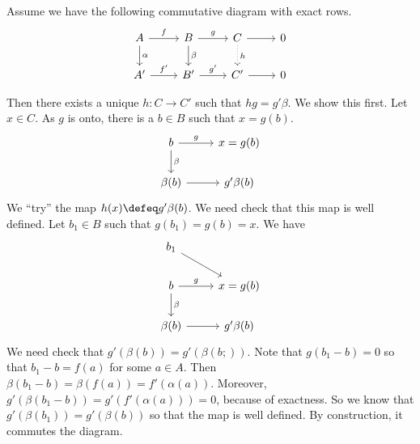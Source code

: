 \pf Assume we have the following commutative diagram with exact rows.
	\[
	\begin{tikzcd}
	A \arrow{r}{f} \arrow{d}{\alpha} & B \arrow{r}{g} \arrow{d}{\beta} & C \arrow{r} \arrow[dotted]{d}{h} & 0 \\
	A' \arrow{r}{f'} & B' \arrow{r}{g'} & C' \arrow{r} & 0
	\end{tikzcd}
	\]




































Then there exists a unique $h: C \rightarrow C'$ such that $hg=g' \beta$. We show this first. Let $x \in C$. As $g$ is onto, there is a $b \in B$ such that $x=g(b)$. 
\[
\begin{tikzcd}
b \arrow{r}{g} \arrow{d}{\beta} & x=g(b) \\
\beta(b) \arrow{r} & g'\beta(b)
\end{tikzcd}
\]
We ``try'' the map $h(x) \defeq g'\beta(b)$. We need check that this map is well defined. Let $b_1 \in B$ such that $g(b_1)=g(b)=x$. We have
\[
\begin{tikzcd}
b_1 \arrow{dr} & \\
b \arrow{r}{g} \arrow{d}{\beta} & x=g(b) \\
\beta(b) \arrow{r} & g'\beta(b)
\end{tikzcd}
\]
We need check that $g'(\beta(b))=g'(\beta(b;))$. Note that $g(b_1-b)=0$ so that $b_1-b=f(a)$ for some $a \in A$. Then $\beta(b_1-b)=\beta(f(a))=f'(\alpha(a))$. Moreover, $g'(\beta(b_1-b))=g'(f'(\alpha(a)))=0$, because of exactness. So we know that $g'(\beta(b_1))=g'(\beta(b))$ so that the map is well defined. By construction, it commutes the diagram. 

